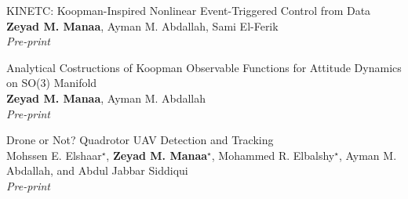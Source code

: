 \begin{bibenum}
    \item {KINETC: Koopman-Inspired Nonlinear Event-Triggered Control from Data}\\
    \textbf{Zeyad M. Manaa}, Ayman M. Abdallah, Sami El-Ferik\\
    \textit{Pre-print}

    \item {Analytical Costructions of Koopman Observable Functions for Attitude Dynamics on SO(3) Manifold}\\
    \textbf{Zeyad M. Manaa}, Ayman M. Abdallah\\
    \textit{Pre-print}

    \item {Drone or Not? Quadrotor UAV Detection and Tracking}\\
    Mohssen E. Elshaar$^{\star}$, \textbf{Zeyad M. Manaa}$^{\star}$, Mohammed R. Elbalshy$^{\star}$, Ayman M. Abdallah, and Abdul Jabbar Siddiqui\\
    \textit{Pre-print}
\end{bibenum}